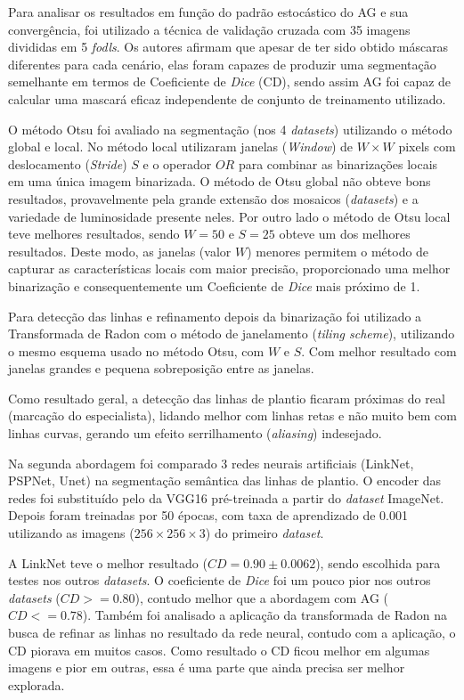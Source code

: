 \documentclass[12pt, a4paper, english, brazil]{article}
\newcommand{\textRed}[1]{{{\color{red} #1}}}
\begin{document}
Para analisar os resultados em função do padrão estocástico do AG e sua convergência, foi utilizado a técnica de validação cruzada com 35 imagens divididas em 5 \textit{fodls}. Os autores afirmam que apesar de ter sido obtido máscaras diferentes para cada cenário, elas foram capazes de produzir uma segmentação semelhante em termos de Coeficiente de \textit{Dice} (CD), sendo assim AG foi capaz de calcular uma mascará eficaz independente de conjunto de treinamento utilizado.

O método Otsu foi avaliado na segmentação (nos 4 \textit{datasets}) utilizando o método global e local. No método local utilizaram janelas (\textit{Window}) de $W \times W$ pixels com deslocamento (\textit{Stride}) $S$ e o operador $OR$ para combinar as binarizações locais em uma única imagem binarizada. O método de Otsu global não obteve bons resultados, provavelmente pela grande extensão dos mosaicos (\textit{datasets}) e a variedade de luminosidade presente neles. Por outro lado o método de Otsu local teve melhores resultados, sendo $W=50$ e $S=25$ obteve um dos melhores resultados. Deste modo, as janelas (valor $W$) menores permitem o método de capturar as características locais com maior precisão, proporcionado uma melhor binarização e consequentemente um Coeficiente de \textit{Dice} mais próximo de 1.

Para detecção das linhas e refinamento depois da binarização foi utilizado a Transformada de Radon com o método de janelamento (\textit{tiling scheme}), utilizando o mesmo esquema usado no método Otsu, com $W$ e $S$. Com melhor resultado com janelas grandes e pequena sobreposição entre as janelas.

Como resultado geral, a detecção das linhas de plantio ficaram próximas do real (marcação do especialista), lidando melhor com linhas retas e não muito bem com linhas curvas, gerando um efeito serrilhamento (\textit{aliasing}) indesejado. 

Na segunda abordagem foi comparado 3 redes neurais artificiais (LinkNet, PSPNet, Unet) na segmentação semântica das linhas de plantio.
O \textRed{encoder} das redes foi substituído pelo da VGG16 pré-treinada a partir do \textit{dataset} ImageNet. Depois foram treinadas por 50 épocas, com taxa de aprendizado de 0.001 utilizando as imagens ($256 \times 256 \times 3$) do primeiro \textit{dataset}.

A LinkNet teve o melhor resultado ($CD = 0.90 \pm 0.0062$), sendo escolhida para testes nos outros \textit{datasets}. O coeficiente de \textit{Dice} foi um pouco pior nos outros \textit{datasets} ($CD >= 0.80$), contudo melhor que a abordagem com AG ($CD <= 0.78$). Também foi analisado a aplicação da transformada de Radon na busca de refinar as linhas no resultado da rede neural, contudo com a aplicação, o CD piorava em muitos casos. Como resultado o CD ficou melhor em algumas imagens e pior em outras, essa é uma parte que ainda precisa ser melhor explorada.
\end{document}
